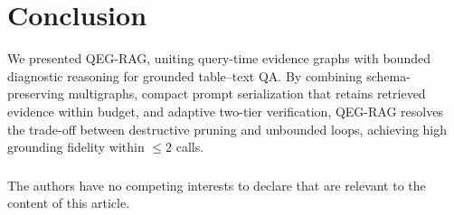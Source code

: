 \documentclass[runningheads]{llncs}
\begin{document}
\vspace{-2.5mm}
\section{Conclusion}
\label{sec:conclusion}
\vspace{-1mm}
We presented QEG-RAG, uniting query-time evidence graphs with bounded diagnostic reasoning for grounded table--text QA. By combining schema-preserving multigraphs, compact prompt serialization that retains retrieved evidence within budget, and adaptive two-tier verification, QEG-RAG resolves the trade-off between destructive pruning and unbounded loops, achieving high grounding fidelity within $\le 2$ calls.

\vspace{-3mm}
\begin{credits}
\subsubsection{\discintname}
The authors have no competing interests to declare that are relevant to the content of this article.
\end{credits}

\afterpage{\enlargethispage{2.5\baselineskip}}


\end{document}
